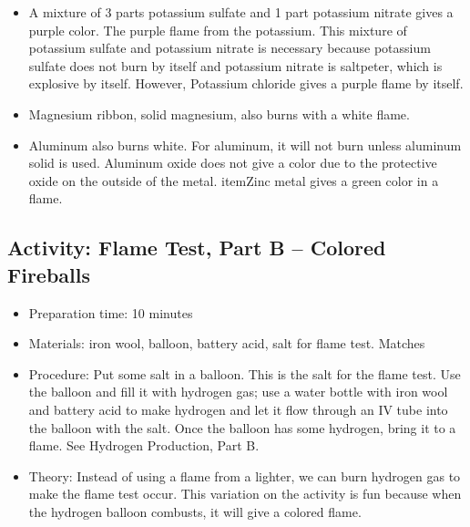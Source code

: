 \begin{itemize}
{\begin{itemize}
\begin{itemize}
{\begin{itemize}
\item{A mixture of 3 parts potassium sulfate and 1 part potassium nitrate gives a purple color. The purple flame from the potassium. This mixture of potassium sulfate and potassium nitrate is necessary because potassium sulfate does not burn by itself and potassium nitrate is saltpeter, which is explosive by itself. However, Potassium chloride gives a purple flame by itself.}
\item{Magnesium ribbon, solid magnesium, also burns with a white flame.}
\item{Aluminum also burns white. For aluminum, it will not burn unless aluminum solid is used. Aluminum oxide does not give a color due to the protective oxide on the outside of the metal.}
item{Zinc metal gives a green color in a flame.}
\end{itemize}
} %
\end{itemize}

\subsection{Activity: Flame Test, Part B – Colored Fireballs}
\begin{itemize}
\item{Preparation time: 10 minutes}
\item{Materials: iron wool, balloon, battery acid, salt for flame test. Matches}
\item{Procedure: Put some salt in a balloon. This is the salt for the flame test. Use the balloon and fill it with hydrogen gas; use a water bottle with iron wool and battery acid to make hydrogen and let it flow through an IV tube into the balloon with the salt. Once the balloon has some hydrogen, bring it to a flame. See Hydrogen Production, Part B.}
\item{Theory: Instead of using a flame from a lighter, we can burn hydrogen gas to make the flame test occur. This variation on the activity is fun because when the hydrogen balloon combusts, it will give a colored flame. }
\end{itemize}


\end{itemize}}
\end{itemize}
